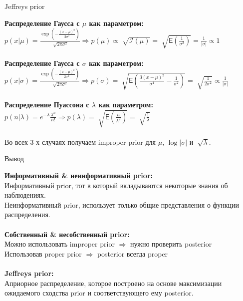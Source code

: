 \documentclass[10pt]{beamer}
\begin{document}
\begin{frame}{Jeffreys prior}

{\bf Распределение Гаусса с $\mu$ как параметром:}\\
\quad
	$p(x|\mu) = \frac{\exp\left(-\frac{(x-\mu)^2}{2\sigma^2}\right)}{\sqrt[]{2\pi\sigma^2}}\Rightarrow p(\mu) \propto \sqrt[]{\mathcal{I}(\mu)} = \sqrt[]{\mathsf{E}\left(\frac{1}{\sigma^2}\right)} = \frac{1}{|\sigma|} \propto 1$\\
	~\\
{\bf Распределение Гаусса с $\sigma$ как параметром:}\\
\quad
	$p(x|\sigma) = \frac{\exp\left(-\frac{(x-\mu)^2}{2\sigma^2}\right)}{\sqrt[]{2\pi\sigma^2}} \Rightarrow p(\sigma) = \sqrt[]{\mathsf{E}\left(\frac{3(x-\mu)^2}{\sigma^4} - \frac{1}{\sigma^2}\right)} = \sqrt[]{\frac{1}{2\sigma^2}}\propto \frac{1}{|\sigma|}$\\
	~\\
{\bf Распределение Пуассона с $\lambda$ как параметром:}\\
\quad
	$p(n|\lambda) = e^{-\lambda}\frac{\lambda^n}{n!} \Rightarrow p(\lambda) = \sqrt[]{\mathsf{E}\left(\frac{n}{\lambda^2}\right)} = \sqrt[]{\frac{1}{\lambda}}$\\
	~\\
	
Во всех 3-х случаях получаем improper prior для $\mu$, $\log|\sigma|$ и $\sqrt[]{\lambda}$.
\end{frame}
\begin{frame}{Вывод}

{\bf Информативный \& неинформативный prior:}\\
\quad
	Информативный prior, тот в который вкладываются некоторые знания об наблюдениях.\\
\quad
	Неинформативный prior, использует только общие представления о функции распределения.\\
	~\\
{\bf Собственный \& несобственный prior:}\\
\quad
	Можно использовать improper prior $\Rightarrow$ нужно проверить posterior\\
\quad
	Использовав proper prior $\Rightarrow$ posterior всегда proper\\
	~\\
{\bf Jeffreys prior:}\\
\quad
	Априорное распределение, которое построено на основе максимизации ожидаемого сходства prior и соответствующего ему posterior.
	~\\
\end{frame}
\end{document}

